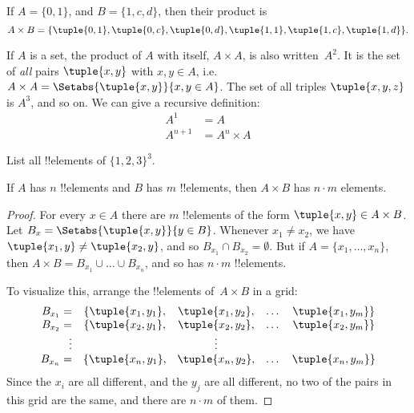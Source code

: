 	\begin{ex}
		If $A = \{0, 1\}$, and $B = \{1, c, d\}$, then their product is
		\[
			A\times B = \{ \tuple{0, 1}, \tuple{0, c}, \tuple{0, d},
		\tuple{1, 1}, \tuple{1, c}, \tuple{1, d} \}.
		\]
	\end{ex}
	
	\begin{ex}
		If $A$ is a set, the product of $A$ with itself, $A \times A$, is also
		written~$A^2$. It is the set of \emph{all} pairs $\tuple{x, y}$ with
		$x, y \in A$, i.e.\ $A \times A = \Setabs{\tuple{x,y}}{x, y \in A}$. The set of all triples $\tuple{x, y, z}$ is $A^3$, and
		so on. We can give a recursive definition:
		\begin{align*}
			A^1 & = A\\
			A^{n+1} & = A^n \times A
		\end{align*}
	\end{ex}
	
	\begin{prob}
		List all !!{element}s of $\{1, 2, 3\}^3$.
	\end{prob}
	
	\begin{prop}
		If $A$ has $n$ !!{element}s and $B$ has $m$ !!{element}s, then $A
		\times B$ has $n\cdot m$ elements.
	\end{prop}
	\begin{proof}
		For every $x \in A$ there are $m$ !!{element}s of the form $\tuple{x, y} \in A \times B$. Let $B_x = \Setabs{\tuple{x, y}}{y \in B}$. Whenever $x_1 \neq x_2$, we have $\tuple{x_1, y} \neq
		\tuple{x_2, y}$, and so $B_{x_1} \cap B _{x_2} = \emptyset$. But if $A = \{x_1,
		\dots, x_n\}$, then $A \times B = B_{x_1} \cup \dots \cup B_{x_n}$, and so has
		$n\cdot m$ !!{element}s.
		
		To visualize this, arrange the !!{element}s of~$A \times B$ in a grid:
		\[
		\begin{array}{rcccc}
		B_{x_1} = & \{\tuple{x_1, y_1}, & \tuple{x_1, y_2}, & \dots & \tuple{x_1, y_m}\}\\
		B_{x_2} = & \{\tuple{x_2, y_1}, & \tuple{x_2, y_2}, & \dots & \tuple{x_2, y_m}\}\\
		\vdots & & \vdots\\
		B_{x_n} = & \{\tuple{x_n, y_1}, & \tuple{x_n, y_2}, & \dots & \tuple{x_n, y_m}\}
		\end{array}
		\]
		Since the $x_i$ are all different, and the $y_j$ are all different, no
		two of the pairs in this grid are the same, and there are $n\cdot m$
		of them.
	\end{proof}
	
